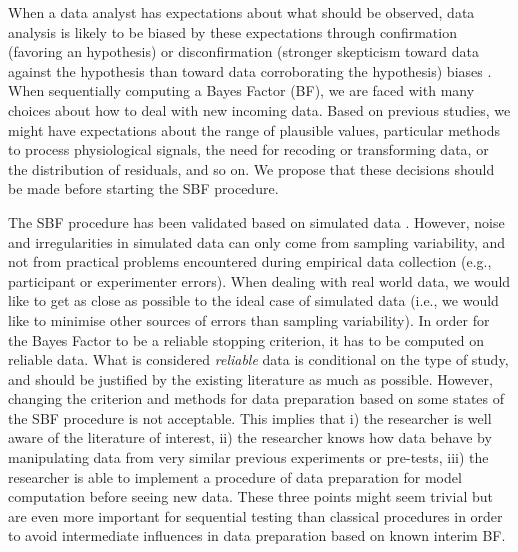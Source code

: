 \documentclass[a4paper,man,natbib,floatsintext,donotrepeattitle]{apa6}
\begin{document}
When a data analyst has expectations about what should be observed, data analysis is likely to be biased by these expectations through confirmation (favoring an hypothesis) or disconfirmation (stronger skepticism toward data against the hypothesis than toward data corroborating the hypothesis) biases \citep{lilienfeld_blind_2017}.
When sequentially computing a Bayes Factor (BF), we are faced with many choices about how to deal with new incoming data. Based on previous studies, we might have expectations about the range of plausible values, particular methods to process physiological signals, the need for recoding or transforming data, or the distribution of residuals, and so on. We propose that these decisions should be made before starting the SBF procedure.

The SBF procedure has been validated based on simulated data \citep{schonbrodt_sequential_2017}. However, noise and irregularities in simulated data can only come from sampling variability, and not from practical problems encountered during empirical data collection (e.g., participant or experimenter errors). When dealing with real world data, we would like to get as close as possible to the ideal case of simulated data (i.e., we would like to minimise other sources of errors than sampling variability). In order for the Bayes Factor to be a reliable stopping criterion, it has to be computed on reliable data. What is considered \textit{reliable} data is conditional on the type of study, and should be justified by the existing literature as much as possible. However, changing the criterion and methods for data preparation based on some states of the SBF procedure is not acceptable. This implies that i) the researcher is well aware of the literature of interest, ii) the researcher knows how data behave by manipulating data from very similar previous experiments or pre-tests, iii) the researcher is able to implement a procedure of data preparation for model computation before seeing new data. These three points might seem trivial but are even more important for sequential testing than classical procedures in order to avoid intermediate influences in data preparation based on known interim BF.
\end{document}
